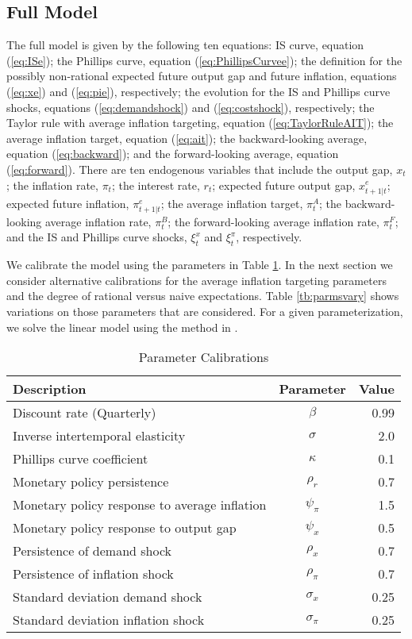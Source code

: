 \documentclass[12pt]{article}
\newcommand{\citee}[1]{\citename{#1} \citeyear{#1}}
\begin{document}
\subsection{Full Model}

The full model is given by the following ten equations: IS curve, equation (\ref{eq:ISe}); the Phillips curve, equation (\ref{eq:PhillipsCurvee}); the definition for the possibly non-rational expected future output gap and future inflation, equations (\ref{eq:xe}) and (\ref{eq:pie}), respectively; the evolution for the IS and Phillips curve shocks, equations (\ref{eq:demandshock}) and (\ref{eq:costshock}), respectively; the Taylor rule with average inflation targeting, equation (\ref{eq:TaylorRuleAIT}); the average inflation target, equation (\ref{eq:ait}); the backward-looking average, equation (\ref{eq:backward}); and the forward-looking average, equation (\ref{eq:forward}). There are ten endogenous variables that include the output gap, $x_t$; the inflation rate, $\pi_t$; the interest rate, $r_t$; expected future output gap, $x_{t+1|t}^e$; expected future inflation, $\pi_{t+1|t}^e$; the average inflation target, $\pi_t^A$; the backward-looking average inflation rate, $\pi_t^B$; the forward-looking average inflation rate, $\pi_t^F$; and the IS and Phillips curve shocks, $\xi_t^x$ and $\xi_t^\pi$, respectively.

We calibrate the model using the parameters in Table \ref{tb:parms}. In the next section we consider alternative calibrations for the average inflation targeting parameters and the degree of rational versus naive expectations. Table \ref{tb:parmsvary} shows variations on those parameters that are considered. For a given parameterization, we solve the linear model using the method in \citee{sims_solving_2002}.

\begin{table}\caption{Parameter Calibrations}\label{tb:parms}
  \begin{center}
    \begin{tabular}{lcr} \hline
      Description & Parameter & Value \\ \hline
      Discount rate (Quarterly) & $\beta$ & 0.99 \\
      Inverse intertemporal elasticity & $\sigma$ & 2.0 \\
      Phillips curve coefficient & $\kappa$ & 0.1 \\
      Monetary policy persistence & $\rho_r$ & 0.7 \\
      Monetary policy response to average inflation & $\psi_\pi$ & 1.5 \\
      Monetary policy response to output gap & $\psi_x$ & 0.5 \\
      Persistence of demand shock & $\rho_x$ & 0.7 \\
      Persistence of inflation shock & $\rho_\pi$ & 0.7 \\
      Standard deviation demand shock & $\sigma_x$ & 0.25 \\
      Standard deviation inflation shock & $\sigma_\pi$ & 0.25 \\
      \hline
     \end{tabular}
  \end{center}
\end{table}
\end{document}
